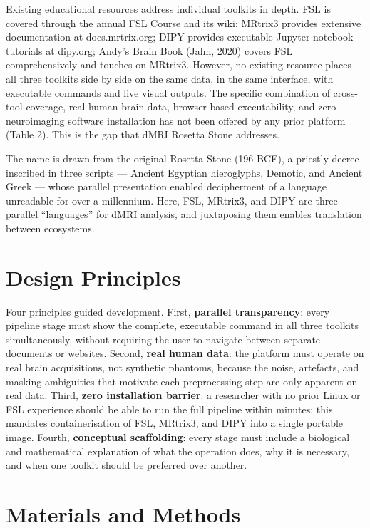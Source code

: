\documentclass[12pt,a4paper]{article}
\begin{document}
Existing educational resources address individual toolkits in depth. FSL is covered through the annual FSL Course and its wiki; MRtrix3 provides extensive documentation at docs.mrtrix.org; DIPY provides executable Jupyter notebook tutorials at dipy.org; Andy's Brain Book (Jahn, 2020) covers FSL comprehensively and touches on MRtrix3. However, no existing resource places all three toolkits side by side on the same data, in the same interface, with executable commands and live visual outputs. The specific combination of cross-tool coverage, real human brain data, browser-based executability, and zero neuroimaging software installation has not been offered by any prior platform (Table 2). This is the gap that dMRI Rosetta Stone addresses.

The name is drawn from the original Rosetta Stone (196 BCE), a priestly decree inscribed in three scripts --- Ancient Egyptian hieroglyphs, Demotic, and Ancient Greek --- whose parallel presentation enabled decipherment of a language unreadable for over a millennium. Here, FSL, MRtrix3, and DIPY are three parallel ``languages'' for dMRI analysis, and juxtaposing them enables translation between ecosystems.

\section{Design Principles}\label{design-principles}

Four principles guided development. First, \textbf{parallel transparency}: every pipeline stage must show the complete, executable command in all three toolkits simultaneously, without requiring the user to navigate between separate documents or websites. Second, \textbf{real human data}: the platform must operate on real brain acquisitions, not synthetic phantoms, because the noise, artefacts, and masking ambiguities that motivate each preprocessing step are only apparent on real data. Third, \textbf{zero installation barrier}: a researcher with no prior Linux or FSL experience should be able to run the full pipeline within minutes; this mandates containerisation of FSL, MRtrix3, and DIPY into a single portable image. Fourth, \textbf{conceptual scaffolding}: every stage must include a biological and mathematical explanation of what the operation does, why it is necessary, and when one toolkit should be preferred over another.

\section{Materials and Methods}\label{materials-and-methods}
\end{document}
